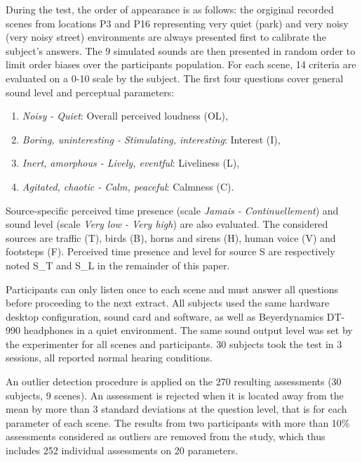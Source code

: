\documentclass{article}
\begin{document}
\begin{sloppy}
During the test, the order of appearance is as follows: the orgiginal recorded scenes from locations P3 and P16 representing very quiet (park) and very noisy (very noisy street) environments are always presented first to calibrate the subject's answers. The 9 simulated sounds are then presented in random order to limit order biases over the participants population. For each scene, 14 criteria are evaluated on a 0-10 scale by the subject. The first four questions cover general sound level and perceptual parameters:
\begin{enumerate}
\item \textit{Noisy - Quiet}: Overall perceived loudness (OL),
\item \textit{Boring, uninteresting - Stimulating, interesting}: Interest (I),
\item \textit{Inert, amorphous - Lively, eventful}: Liveliness (L),
\item \textit{Agitated, chaotic - Calm, peaceful}: Calmness (C).
\end{enumerate}
Source-specific perceived time presence (scale \textit{Jamais - Continuellement}) and sound level (scale \textit{Very low - Very high}) are also evaluated. The considered sources are traffic (T), birds (B), horns and sirens (H), human voice (V) and footsteps (F). Perceived time presence and level for source S are respectively noted S\_T and S\_L in the remainder of this paper.

Participants can only listen once to each scene and must answer all questions before proceeding to the next extract. All subjects used the same hardware desktop configuration, sound card and software, as well as Beyerdynamics DT-990 headphones in a quiet environment. The same sound output level was set by the experimenter for all scenes and participants. 30 subjects took the test in 3 sessions, all reported normal hearing conditions.

An outlier detection procedure is applied on the 270 resulting assessments (30 subjects, 9 scenes). An assessment is rejected when it is located away from the mean by more than 3 standard deviations at the question level, that is for each parameter of each scene. The results from two participants with more than 10\% assessments considered as outliers are removed from the study, which thus includes 252 individual assessments on 20 parameters.


\end{sloppy}
\end{document}

